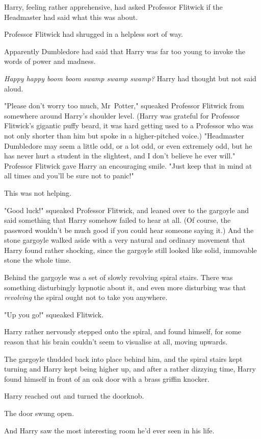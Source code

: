Harry, feeling rather apprehensive, had asked Professor Flitwick if the
Headmaster had said what this was about.

Professor Flitwick had shrugged in a helpless sort of way.

Apparently Dumbledore had said that Harry was far too young to invoke the words
of power and madness.

\emph{Happy happy boom boom swamp swamp swamp?} Harry had thought but not said
aloud.

"Please don’t worry too much, Mr~Potter," squeaked Professor Flitwick from
somewhere around Harry’s shoulder level. (Harry was grateful for Professor
Flitwick’s gigantic puffy beard, it was hard getting used to a Professor who
was not only shorter than him but spoke in a higher-pitched voice.) "Headmaster
Dumbledore may seem a little odd, or a lot odd, or even extremely odd, but he
has never hurt a student in the slightest, and I don’t believe he ever will."
Professor Flitwick gave Harry an encouraging smile. "Just keep that in mind at
all times and you’ll be sure not to panic!"

This was not helping.

"Good luck!" squeaked Professor Flitwick, and leaned over to the gargoyle and
said something that Harry somehow failed to hear at all. (Of course, the
password wouldn’t be much good if you could hear someone saying it.) And the
stone gargoyle walked aside with a very natural and ordinary movement that
Harry found rather shocking, since the gargoyle still looked like solid,
immovable stone the whole time.

Behind the gargoyle was a set of slowly revolving spiral stairs. There was
something disturbingly hypnotic about it, and even more disturbing was that
\emph{revolving} the spiral ought not to take you anywhere.

"Up you go!" squeaked Flitwick.

Harry rather nervously stepped onto the spiral, and found himself, for some
reason that his brain couldn’t seem to visualise at all, moving upwards.

The gargoyle thudded back into place behind him, and the spiral stairs kept
turning and Harry kept being higher up, and after a rather dizzying time, Harry
found himself in front of an oak door with a brass griffin knocker.

Harry reached out and turned the doorknob.

The door swung open.

And Harry saw the most interesting room he’d ever seen in his life.

